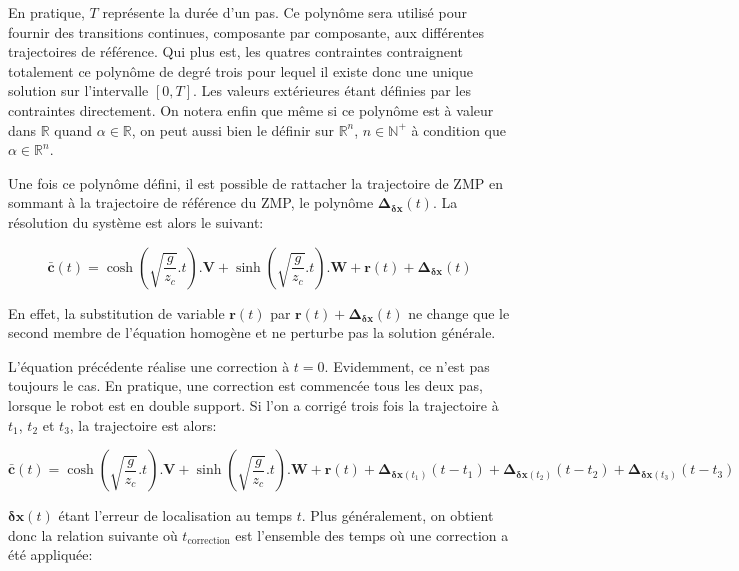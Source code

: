 En pratique, $T$ représente la durée d'un pas. Ce polynôme sera
utilisé pour fournir des transitions continues, composante par
composante, aux différentes trajectoires de référence. Qui plus est,
les quatres contraintes contraignent totalement ce polynôme de degré
trois pour lequel il existe donc une unique solution sur l'intervalle
$[0,T]$. Les valeurs extérieures étant définies par les contraintes
directement. On notera enfin que même si ce polynôme est à valeur dans
$\mathbb{R}$ quand $\alpha \in \mathbb{R}$, on peut aussi bien le
définir sur $\mathbb{R}^n$, $n \in \mathbb{N}^+$ à condition que
$\alpha \in \mathbb{R}^n$.


Une fois ce polynôme défini, il est possible de rattacher la
trajectoire de ZMP en sommant à la trajectoire de référence du ZMP, le
polynôme $\mathbf{\Delta}_{\mathbf{\delta {x}}}(t)$. La résolution du
système est alors le suivant:

\begin{equation} \label{eq:zmpsolcor}
  \bar{\mathbf{c}}(t) = \cosh(\sqrt{\frac{g}{z_c}}.t) . \mathbf{V} +
  \sinh(\sqrt{\frac{g}{z_c}}.t) . \mathbf{W} + \mathbf{r}(t) + \mathbf{\Delta}_{\mathbf{\delta {x}}}(t)
\end{equation}

En effet, la substitution de variable $\mathbf{r}(t)$ par
$\mathbf{r}(t) + \mathbf{\Delta}_{\mathbf{\delta {x}}}(t)$ ne change
que le second membre de l'équation homogène et ne perturbe pas la
solution générale.

L'équation précédente réalise une correction à $t=0$. Evidemment, ce
n'est pas toujours le cas. En pratique, une correction est commencée
tous les deux pas, lorsque le robot est en double support. Si l'on a
corrigé trois fois la trajectoire à $t_1$, $t_2$ et $t_3$, la
trajectoire est alors:

\begin{equation} \label{eq:zmpsolcor2}
  \bar{\mathbf{c}}(t) = \cosh(\sqrt{\frac{g}{z_c}}.t) . \mathbf{V} +
  \sinh(\sqrt{\frac{g}{z_c}}.t) . \mathbf{W} + \mathbf{r}(t) +
  \mathbf{\Delta}_{\mathbf{\delta {x}}(t_1)}(t-t_1) +
  \mathbf{\Delta}_{\mathbf{\delta {x}}(t_2)}(t-t_2) +
  \mathbf{\Delta}_{\mathbf{\delta {x}}(t_3)}(t-t_3)
\end{equation}

$\mathbf{\delta {x}}(t)$ étant l'erreur de localisation au temps
$t$. Plus généralement, on obtient donc la relation suivante où
$t_{\text{correction}}$ est l'ensemble des temps où une correction a
été appliquée:

